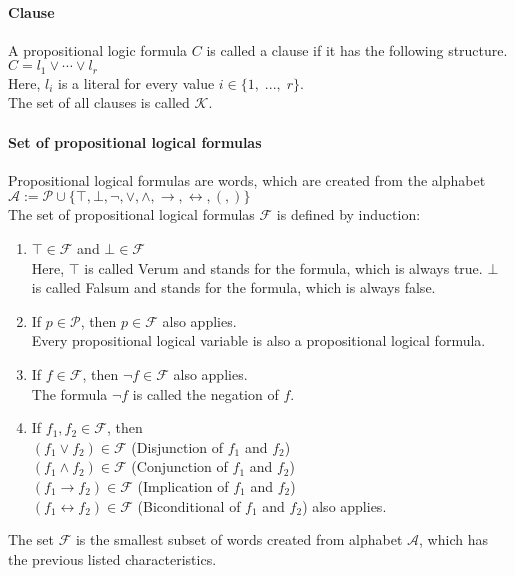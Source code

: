 \paragraph{Clause}
A propositional logic formula $C$ is called a clause if it has the following structure.
\\[0.2cm]
\hspace*{1.3cm} $C = l_1 \vee \cdots \vee l_r$ \\[0.2cm] Here, $l_i$ is a literal for every value $i \in \{1,\; ...,\; r\}$.
\\[0.2cm]
The set of all clauses is called $\mathcal{K}$.

\paragraph{Set of propositional logical formulas}
Propositional logical formulas are words, which are created from the alphabet $\mathcal{A}:= \mathcal{P} \cup \{\top,\bot,\neg,\vee,\land,\rightarrow,\leftrightarrow,(,)\}$ \\
The set of propositional logical formulas $\mathcal{F}$ is defined by induction: 
\begin{enumerate}
  \item $\top \in \mathcal{F}$ and $\bot \in \mathcal{F}$ \\
  Here, $\top$ is called Verum and stands for the formula, which is always true. $\bot$ is called Falsum and stands for the formula, which is always false.
  \item If $p \in \mathcal{P}$, then $p \in \mathcal{F}$ also applies. \\
  Every propositional logical variable is also a propositional logical formula.
  \item If $f \in \mathcal{F}$, then $\neg f \in \mathcal{F}$ also applies. \\
  The formula $\neg f$ is called the negation of $f$.
  \item If $f_1, f_2 \in \mathcal{F}$, then \\
  $(f_1 \vee f_2) \in \mathcal{F}$ (Disjunction of $f_1$ and $f_2$) \\
  $(f_1 \land f_2) \in \mathcal{F}$ (Conjunction of $f_1$ and $f_2$) \\
  $(f_1 \rightarrow f_2) \in \mathcal{F}$ (Implication of $f_1$ and $f_2$) \\
  $(f_1 \leftrightarrow f_2) \in \mathcal{F}$ (Biconditional of $f_1$ and $f_2$)
  also applies.
\end{enumerate}
The set $\mathcal{F}$ is the smallest subset of words created from alphabet $\mathcal{A}$, which has the previous listed characteristics.

